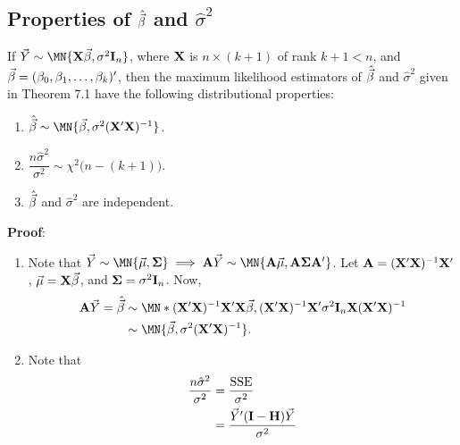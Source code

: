 \subsection*{Properties of $ \hat{\vec{\beta}} $ and $ \hat{\sigma}^2 $}
\begin{Theorem}{}{}
    If $ \Vector{Y}\sim \MN{\Matrix{X}\Vector{\beta},\sigma^2 \Matrix{I}_n} $, where $ \mathbf{X} $
    is $ n\times(k+1) $ of rank $ k+1<n $, and $ \vec{\beta}=(\beta_0,\beta_1,\ldots,\beta_k)' $, then
    the maximum likelihood estimators of $ \hat{\vec{\beta}} $ and $ \hat{\sigma}^2 $ given in Theorem 7.1 have the following distributional properties:
    \begin{enumerate}[(1)]
        \item $ \hat{\Vector{\beta}}\sim \MN{\Vector{\beta},\sigma^2(\Matrix{X}'\Matrix{X})^{-1}} $.
        \item $ \dfrac{n\hat{\sigma}^2}{\sigma^2}\sim \chi^2\bigl(n-(k+1)\bigr) $.
        \item $ \hat{\vec{\beta}} $ and $ \hat{\sigma}^2 $ are independent.
    \end{enumerate}
    \tcblower{}
    \textbf{Proof}:
    \begin{enumerate}[(1)]
        \item Note that $ \Vector{Y}\sim \MN{\Vector{\mu},\Matrix{\Sigma}}\implies \Matrix{A}\Vector{Y}\sim \MN{\Matrix{A}\Vector{\mu},\Matrix{A}\Matrix{\Sigma}\Matrix{A}'} $.
              Let $ \mathbf{A}=(\mathbf{X}'\mathbf{X})^{-1}\mathbf{X}' $, $ \vec{\mu}=\mathbf{X}\vec{\beta} $, and $ \mathbf{\Sigma}=\sigma^2 \mathbf{I}_n $. Now,
              \begin{align*}
                  \Matrix{A}\Vector{Y}=\hat{\Vector{\beta}} & \sim \MN*{(\Matrix{X}'\Matrix{X})^{-1}\Matrix{X}'\Matrix{X}\Vector{\beta},(\Matrix{X}'\Matrix{X})^{-1}\Matrix{X}'\sigma^2 \Matrix{I}_n\Matrix{X}(\Matrix{X}'\Matrix{X})^{-1}} \\
                                                            & \sim\MN{\Vector{\beta},\sigma^2(\Matrix{X}'\Matrix{X})^{-1}}.
              \end{align*}
        \item Note that
              \begin{align*}
                  \frac{n\hat{\sigma}^2}{\sigma^2}
                   & =\frac{\text{SSE}}{\sigma^2}                                   \\
                   & =\frac{\Vector{Y}'(\Matrix{I}-\Matrix{H})\Vector{Y}}{\sigma^2} \\

\end{align*}
\end{enumerate}
\end{Theorem}
